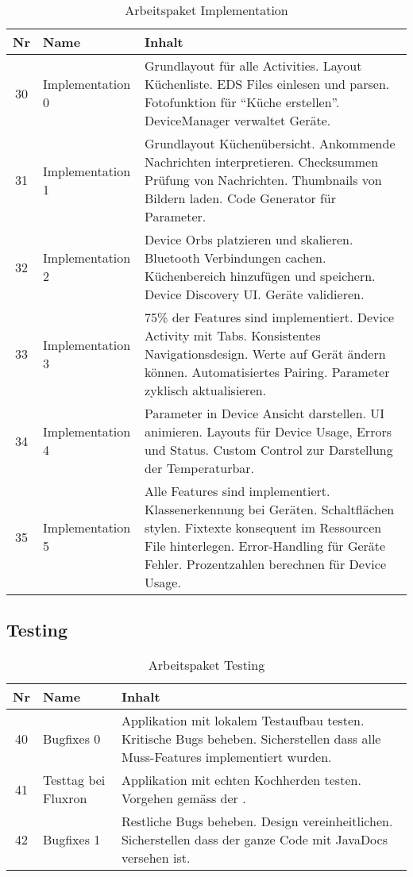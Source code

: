 \begin{table}[H]
\begin{tabularx}{\textwidth}{ c | l | X }
\textbf{Nr} & \textbf{Name} & \textbf{Inhalt} \\ \hline
30 & Implementation 0 & Grundlayout für alle Activities. Layout Küchenliste. EDS Files einlesen und parsen. Fotofunktion für \enquote{Küche erstellen}. DeviceManager verwaltet Geräte.\\ \hline
31 & Implementation 1 & Grundlayout Küchenübersicht. Ankommende Nachrichten interpretieren. Checksummen Prüfung von Nachrichten. Thumbnails von Bildern laden. Code Generator für Parameter.\\ \hline
32 & Implementation 2 & Device Orbs platzieren und skalieren. Bluetooth Verbindungen cachen. Küchenbereich hinzufügen und speichern. Device Discovery UI. Geräte validieren.\\ \hline
33 & Implementation 3 & 75\% der Features sind implementiert. Device Activity mit Tabs. Konsistentes Navigationsdesign. Werte auf Gerät ändern können. Automatisiertes Pairing. Parameter zyklisch aktualisieren. \\ \hline
34 & Implementation 4 & Parameter in Device Ansicht darstellen. UI animieren. Layouts für Device Usage, Errors und Status. Custom Control zur Darstellung der Temperaturbar.\\ \hline
35 & Implementation 5 & Alle Features sind implementiert. Klassenerkennung bei Geräten. Schaltflächen stylen. Fixtexte konsequent im Ressourcen File hinterlegen. Error-Handling für Geräte Fehler. Prozentzahlen berechnen für Device Usage.\\
\end{tabularx}
\caption{Arbeitspaket Implementation}
\end{table}

\subsection{Testing}

\begin{table}[H]
\begin{tabularx}{\textwidth}{ c | l | X }
\textbf{Nr} & \textbf{Name} & \textbf{Inhalt} \\ \hline
40 & Bugfixes 0 & Applikation mit lokalem Testaufbau testen. Kritische Bugs beheben. Sicherstellen dass alle Muss-Features implementiert wurden.\\ \hline
41 & Testtag bei Fluxron & Applikation mit echten Kochherden testen. Vorgehen gemäss der \nameref{s:Systemtest_Spezifikation}. \\ \hline
42 & Bugfixes 1 & Restliche Bugs beheben. Design vereinheitlichen. Sicherstellen dass der ganze Code mit JavaDocs versehen ist.\\ \hline
\end{tabularx}
\caption{Arbeitspaket Testing}
\end{table}

